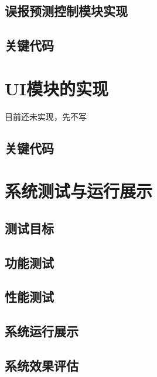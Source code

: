 \subsection{误报预测控制模块实现}

\subsection{关键代码}

\section{UI模块的实现}
目前还未实现，先不写\\
\subsection{关键代码}

\section{系统测试与运行展示}
\subsection{测试目标}
\subsection{功能测试}
\subsection{性能测试}
\subsection{系统运行展示}
\subsection{系统效果评估}